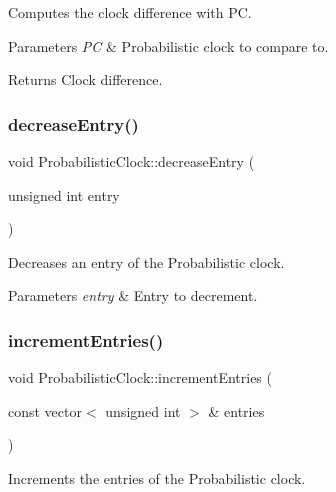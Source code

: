 Computes the clock difference with PC. 


\begin{DoxyParams}{Parameters}
{\em PC} & Probabilistic clock to compare to. \\
\hline
\end{DoxyParams}
\begin{DoxyReturn}{Returns}
Clock difference. 
\end{DoxyReturn}
\mbox{\label{class_probabilistic_clock_aaa864cb9c0e2cfcf0bf28a3f534e0c6a}} 
\subsubsection{\texorpdfstring{decrease\+Entry()}{decreaseEntry()}}
{\footnotesize\ttfamily void Probabilistic\+Clock\+::decrease\+Entry (\begin{DoxyParamCaption}\item[{unsigned int}]{entry }\end{DoxyParamCaption})}



Decreases an entry of the Probabilistic clock. 


\begin{DoxyParams}{Parameters}
{\em entry} & Entry to decrement. \\
\hline
\end{DoxyParams}
\mbox{\label{class_probabilistic_clock_a5c510e2d21bc580468c491a71382a4d4}} 
\subsubsection{\texorpdfstring{increment\+Entries()}{incrementEntries()}}
{\footnotesize\ttfamily void Probabilistic\+Clock\+::increment\+Entries (\begin{DoxyParamCaption}\item[{const vector$<$ unsigned int $>$ \&}]{entries }\end{DoxyParamCaption})}



Increments the entries of the Probabilistic clock. 

